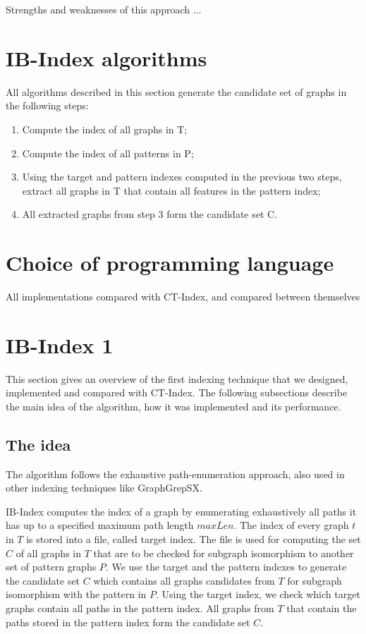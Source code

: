 \documentclass{l4proj}
\theoremstyle{definition}
\begin{document}
    Strengths and weaknesses of this approach ...
    
    \section{IB-Index algorithms}
    
    All algorithms described in this section generate the candidate set of graphs in the following steps:
    
    \begin{enumerate}
        \label{indexSteps}
        \item Compute the index of all graphs in T;
        \item Compute the index of all patterns in P;
        \item Using the target and pattern indexes computed in the previous two steps, extract all graphs in T that contain all features in the pattern index;
        \item All extracted graphs from step 3 form the candidate set C.
	\end{enumerate}
    
\section{Choice of programming language}
    
    All implementations compared with CT-Index, and compared between themselves
    
\section{IB-Index 1}
    This section gives an overview of the first indexing technique that we designed, implemented and compared with CT-Index. The following subsections describe the main idea of the algorithm, how it was implemented and its performance.
    \subsection{The idea}
    The algorithm follows the exhaustive path-enumeration approach, also used in other indexing techniques like GraphGrepSX.%
    
    IB-Index computes the index of a graph by enumerating exhaustively all paths it has up to a specified maximum path length $maxLen$. The index of every graph $t$ in $T$ is stored into a file, called target index. The file  is used for computing the set $C$ of all graphs in $T$ that are to be checked for subgraph isomorphism to another set of pattern graphs $P$. We use the target and the pattern indexes to generate the candidate set $C$ which contains all graphs candidates from $T$ for subgraph isomorphism with the pattern in $P$. Using the target index, we check which target graphs contain all paths in the pattern index. All graphs from $T$ that contain the paths stored in the pattern index form the candidate set $C$.  
    
\end{document}
